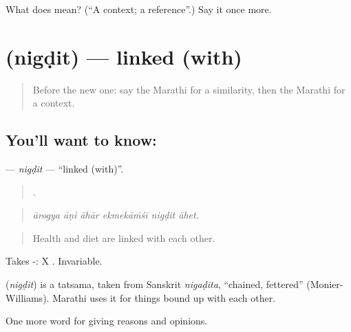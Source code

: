 \begin{tcolorbox}[breakable,colback=teal!4,colframe=teal!35!black,title={Before you move on}]
What does  mean? (\textquotedblleft{}A context; a reference\textquotedblright{}.) Say it once more.
\end{tcolorbox}
\section[\texorpdfstring{\mr{निगडित} (nigḍit)}{निगडित (nigḍit)}]{ (nigḍit) — linked (with)}

\label{lesson:MR-C348-nigdit}



\begin{quote}
Before the new one: say the Marathi for a similarity, then the Marathi for a context.
\end{quote}

\subsection*{You'll want to know: }
\textbf{} — \emph{nigḍit} — \textquotedblleft{}linked (with)\textquotedblright{}.

\begin{quote}
     .
\end{quote}

\begin{quote}
\emph{ārogya āṇi āhār ekmekāṁśī nigḍit āhet.}
\end{quote}

\begin{quote}
Health and diet are linked with each other.
\end{quote}

Takes -: X  . Invariable.

\begin{cousinweb}
\textbf{} (\emph{nigḍit}) is a tatsama, taken from Sanskrit \emph{nigaḍita}, \textquotedblleft{}chained, fettered\textquotedblright{} (Monier-Williams). Marathi uses it for things bound up with each other.
\end{cousinweb}

\begin{grammarlens}[title={What you've built}]
One more word for giving reasons and opinions.
\end{grammarlens}

